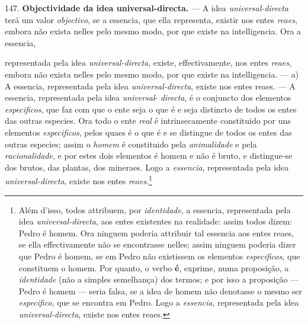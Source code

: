 147. \textbf{Objectividade da idea universal-directa.} --- A idea \emph{universal-directa} terá um valor \emph{objectivo}, se a essencia, que ella representa, existir nos entes \emph{reaes}, embora não exista nelles pelo mesmo modo, por que existe na intelligencia. Ora a essencia,

representada pela idea \emph{universal-directa}, existe, effectivamente, nos entes \emph{reaes}, embora não exista nelles pelo mesmo modo, por que existe na intelligencia. --- a) A essencia, representada pela idea \emph{universal-directa}, existe nos entes reaes. --- A essencia, representada pela idea \emph{universal}-  \emph{directa}, é o conjuncto dos elementos \emph{especificos}, que faz com que o ente seja o que é e seja distincto de todos os entes das outras especies. Ora todo o ente \emph{real} é intrinsecamente constituido por uns elementos \emph{especificos}, pelos quaes é o que é e se distingue de todos os entes das outras especies; assim o \emph{homem} é constituido pela \emph{animalidade} e pela \emph{racionalidade}, e por estes dois elementos é homem e não é bruto, e distingue-se dos brutos, das plantas, dos mineraes. Logo a \emph{essencia}, representada pela idea \emph{universal-directa}, existe nos entes \emph{reaes}.\footnote{Além d'isso, todos attribuem, por \emph{identidade}, a essencia, representada pela idea \emph{universal-directa}, aos entes existentes na realidade: assim todos dizem: Pedro é homem. Ora ninguem poderia attribuir tal essencia aos entes reaes, se ella effectivamente não se encontrasse nelles; assim ninguem poderia dizer que Pedro é homem, se em Pedro não existissem os elementos \emph{especificos}, que constituem o homem. Por quanto, o verbo \textbf{é}, exprime, numa proposição, a \emph{identidade} (não a simples semelhança) dos termos; e por isso a proposição --- Pedro é homem --- seria falsa, se a idea de homem não denotasse o mesmo ser \emph{especifico}, que se encontra em Pedro. Logo a \emph{essencia}, representada pela idea \emph{universal-directa}, existe nos entes reaes.}

